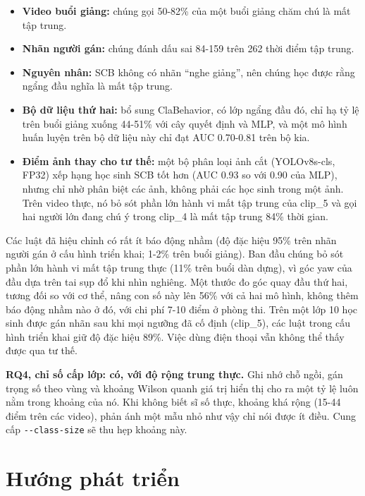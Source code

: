 \begin{itemize}
\tightlist
\item
  \textbf{Video buổi giảng:} chúng gọi 50-82\% của một buổi giảng chăm chú là mất tập trung.
\item
  \textbf{Nhãn người gán:} chúng đánh dấu sai 84-159 trên 262 thời điểm tập trung.
\item
  \textbf{Nguyên nhân:} SCB không có nhãn ``nghe giảng'', nên chúng học được rằng ngẩng đầu nghĩa là mất tập trung.
\item
  \textbf{Bộ dữ liệu thứ hai:} bổ sung ClaBehavior, có lớp ngẩng đầu đó, chỉ hạ tỷ lệ trên buổi giảng xuống 44-51\% với cây quyết định và MLP, và một mô hình huấn luyện trên bộ dữ liệu này chỉ đạt AUC 0.70-0.81 trên bộ kia.
\item
  \textbf{Điểm ảnh thay cho tư thế:} một bộ phân loại ảnh cắt (YOLOv8s-cls, FP32) xếp hạng học sinh SCB tốt hơn (AUC 0.93 so với 0.90 của MLP), nhưng chỉ nhờ phân biệt các ảnh, không phải các học sinh trong một ảnh. Trên video thực, nó bỏ sót phần lớn hành vi mất tập trung của clip\_5 và gọi hai người lớn đang chú ý trong clip\_4 là mất tập trung 84\% thời gian.
\end{itemize}

Các luật đã hiệu chỉnh có rất ít báo động nhầm (độ đặc hiệu 95\% trên nhãn người gán ở cấu hình triển khai; 1-2\% trên buổi giảng). Ban đầu chúng bỏ sót phần lớn hành vi mất tập trung thực (11\% trên buổi dàn dựng), vì góc yaw của đầu dựa trên tai sụp đổ khi nhìn nghiêng. Một thước đo góc quay đầu thứ hai, tương đối so với cơ thể, nâng con số này lên 56\% với cả hai mô hình, không thêm báo động nhầm nào ở đó, với chi phí 7-10 điểm ở phòng thi. Trên một lớp 10 học sinh được gán nhãn sau khi mọi ngưỡng đã cố định (clip\_5), các luật trong cấu hình triển khai giữ độ đặc hiệu 89\%. Việc dùng điện thoại vẫn không thể thấy được qua tư thế.

\textbf{RQ4, chỉ số cấp lớp: có, với độ rộng trung thực.} Ghi nhớ chỗ ngồi, gán trọng số theo vùng và khoảng Wilson quanh giá trị hiển thị cho ra một tỷ lệ luôn nằm trong khoảng của nó. Khi không biết sĩ số thực, khoảng khá rộng (15-44 điểm trên các video), phản ánh một mẫu nhỏ như vậy chỉ nói được ít điều. Cung cấp \texttt{-\/-class-size} sẽ thu hẹp khoảng này.

\section{Hướng phát triển}

